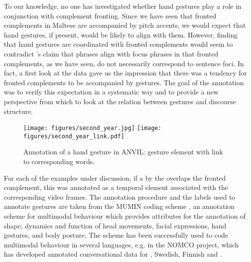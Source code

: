 \documentclass[output=paper]{LSP/langsci}
\begin{document}
To our knowledge, no one has investigated whether hand gestures play a
role in conjunction with complement fronting. Since we have seen that
fronted complements in Maltese are accompanied by pitch accents, we
would expect that hand gestures, if present, would be likely to align
with them. 
However, finding that hand gestures are coordinated with fronted
complements would seem to contradict \citet{Ebertetal11}'s claim that
 phrases align with focus phrases in that fronted complements,
as we have seen, do not necessarily correspond to sentence foci.  In
fact, a first look at the data gave us the impression that there was a
tendency for fronted complements to be accompanied by gestures.  The
goal of the  annotation was to verify this expectation in a
systematic way and to provide a new perspective from which to look at
the relation between gestures and discourse structure.

\begin{figure}
  \texttt{[image: figures/second\_year.jpg]}
   \texttt{[image: figures/second\_year\_link.pdf]}
   \caption{Annotation of a hand gesture in ANVIL: gesture element with link to corresponding words.}
\label{fig:anvil1}
\end{figure}

For each of the examples under discussion, if a  by the
 overlaps the fronted complement, this  was
annotated as a temporal element associated with the corresponding
video frames.
The annotation procedure and the labels used to annotate gestures are
taken from the MUMIN coding scheme \citep{Allwoodetal07}, an annotation
scheme for multimodal behaviour which provides attributes for the
annotation of shape, dynamics and function of head movements, facial
expressions, hand gestures, and body posture. The scheme has been
successfully used to code multimodal behaviour in several languages,
e.g. in the NOMCO project, which has developed annotated
conversational data for , Swedish, Finnish and  \citep{nomco-lrec10, PaggioNavarretta2016}.
\end{document}
